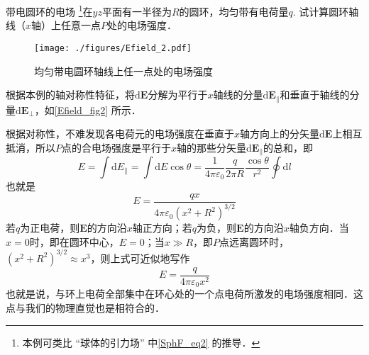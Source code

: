 \begin{example}{带电圆环的电场}\label{Efield_ex2}
\footnote{本例可类比 “球体的引力场” 中\autoref{SphF_eq2} 的推导．}在$yz$平面有一半径为$R$的圆环，均匀带有电荷量$q$. 试计算圆环轴线（$x$轴）上任意一点$P$处的电场强度．
\begin{figure}[ht]
\centering
\texttt{[image: ./figures/Efield\_2.pdf]}
\caption{均匀带电圆环轴线上任一点处的电场强度} \label{Efield_fig2}
\end{figure}

根据本例的轴对称性特征，将$\mathrm d\mathbf E$分解为平行于$x$轴线的分量$\mathrm d\mathbf E_\parallel$和垂直于轴线的分量$\mathrm d\mathbf E_\perp$，如\autoref{Efield_fig2} 所示．

根据对称性，不难发现各电荷元的电场强度在垂直于$x$轴方向上的分矢量$\mathrm d\mathbf E$上相互抵消，所以$P$点的合电场强度是平行于$x$轴的那些分矢量$\mathrm d\mathbf E_\parallel$的总和，即
\begin{equation}
E=\int \mathrm{d} E_\parallel=\int \mathrm{d} E \cos \theta=\frac{1}{4 \pi \varepsilon_{0}} \frac{q}{2 \pi R} \frac{\cos \theta}{r^{2}} \oint \mathrm{d} l
\end{equation}
也就是
\begin{equation} \label{Efield_eq6}
E=\frac{q x}{4 \pi \varepsilon_{0}\left(x^{2}+R^{2}\right)^{3 / 2}} 
\end{equation}
若$q$为正电荷，则$\mathbf E$的方向沿$x$轴正方向；若$q$为负，则$\mathbf E$的方向沿$x$轴负方向．当$x=0$时，即在圆环中心，$E=0$；当$x\gg R$，即$P$点远离圆环时，$\left(x^{2}+R^{2}\right)^{3 / 2} \approx x^{3}$，则上式可近似地写作
\begin{equation}
E=\frac{q}{4 \pi \varepsilon_{0} x^{2}}
\end{equation}
也就是说，与环上电荷全部集中在环心处的一个点电荷所激发的电场强度相同．这点与我们的物理直觉也是相符合的．
\end{example}

